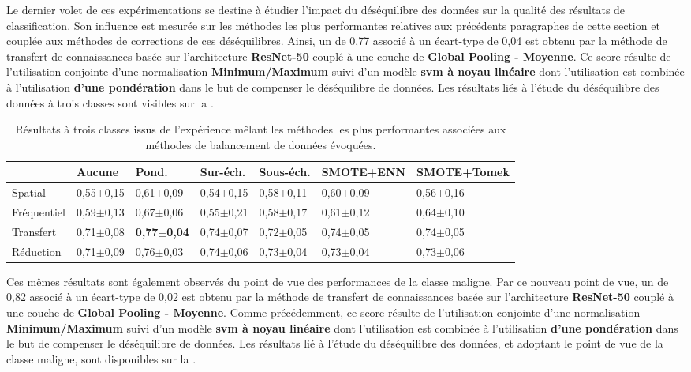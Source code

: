 Le dernier volet de ces expérimentations se destine à étudier l'impact du déséquilibre des données sur la qualité des résultats de classification. Son influence est mesurée sur les méthodes les plus performantes relatives aux précédents paragraphes de cette section et couplée aux méthodes de corrections de ces déséquilibres. Ainsi, un \fscore{} de 0,77 associé à un écart-type de 0,04 est obtenu par la méthode de transfert de connaissances basée sur l'architecture \textbf{ResNet-50} couplé à une couche de \textbf{Global Pooling - Moyenne}. Ce score résulte de l'utilisation conjointe d'une normalisation \textbf{Minimum/Maximum} suivi d'un modèle \textbf{\gls{svm} à noyau linéaire} dont l'utilisation est combinée à l'utilisation \textbf{d'une pondération} dans le but de compenser le déséquilibre de données. Les résultats liés à l'étude du déséquilibre des données à trois classes sont visibles sur la .\par

\begin{table}[H]
    \begin{tabular}{lllllll}
        \toprule
                    & Aucune        & Pond.                 & Sur-éch.      & Sous-éch.     & SMOTE+ENN     & SMOTE+Tomek   \\ \hline
        Spatial     & 0,55$\pm$0,15 & 0,61$\pm$0,09         & 0,54$\pm$0,15 & 0,58$\pm$0,11 & 0,60$\pm$0,09 & 0,56$\pm$0,16 \\
        Fréquentiel & 0,59$\pm$0,13 & 0,67$\pm$0,06         & 0,55$\pm$0,21 & 0,58$\pm$0,17 & 0,61$\pm$0,12 & 0,64$\pm$0,10 \\ \rowcolor[HTML]{E7E6E6}
        Transfert   & 0,71$\pm$0,08 & \textbf{0,77$\pm$0,04}& 0,74$\pm$0,07 & 0,72$\pm$0,05 & 0,74$\pm$0,05 & 0,74$\pm$0,05 \\
        Réduction   & 0,71$\pm$0,09 & 0,76$\pm$0,03         & 0,74$\pm$0,06 & 0,73$\pm$0,04 & 0,73$\pm$0,04 & 0,73$\pm$0,06 \\ \bottomrule
    \end{tabular}
    \caption{Résultats à trois classes issus de l'expérience mêlant les méthodes les plus performantes associées aux méthodes de balancement de données évoquées.}
    \label{tab:results_balancement_multi}
\end{table}\par

Ces mêmes résultats sont également observés du point de vue des performances de la classe maligne. Par ce nouveau point de vue, un \fscore{} de 0,82 associé à un écart-type de 0,02 est obtenu par la méthode de transfert de connaissances basée sur l'architecture \textbf{ResNet-50} couplé à une couche de \textbf{Global Pooling - Moyenne}. Comme précédemment, ce score résulte de l'utilisation conjointe d'une normalisation \textbf{Minimum/Maximum} suivi d'un modèle \textbf{\gls{svm} à noyau linéaire} dont l'utilisation est combinée à l'utilisation \textbf{d'une pondération} dans le but de compenser le déséquilibre de données. Les résultats lié à l'étude du déséquilibre des données, et adoptant le point de vue de la classe maligne, sont disponibles sur la .\par

